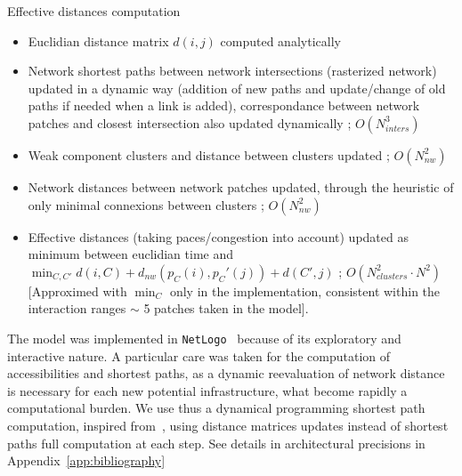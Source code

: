 Effective distances computation

\begin{itemize}
\item Euclidian distance matrix $d(i,j)$ computed analytically
\item Network shortest paths between network intersections (rasterized network) updated in a dynamic way (addition of new paths and update/change of old paths if needed when a link is added), correspondance between network patches and closest intersection also updated dynamically ; $O(N_{inters}^3)$
\item Weak component clusters and distance between clusters updated ; $O(N_{nw}^2)$
\item Network distances between network patches updated, through the heuristic of only minimal connexions between clusters ; $O(N_{nw}^2)$
\item Effective distances (taking paces/congestion into account) updated as minimum between euclidian time and $\min_{C,C'}{d(i,C)+d_{nw}(p_C(i),p_C'(j))+d(C',j)}$ ; $O(N_{clusters}^2\cdot N^2)$ [Approximed with $\min_C$ only in the implementation, consistent within the interaction ranges $\sim$ 5 patches taken in the model]. 
\end{itemize}





The model was implemented in \texttt{NetLogo}~\cite{wilensky1999netlogo} because of its exploratory and interactive nature. A particular care was taken for the computation of accessibilities and shortest paths, as a dynamic reevaluation of network distance is necessary for each new potential infrastructure, what become rapidly a computational burden. We use thus a dynamical programming shortest path computation, inspired from~\cite{tretyakov2011fast}, using distance matrices updates instead of shortest paths full computation at each step. See details in architectural precisions in Appendix~\ref{app:bibliography}


